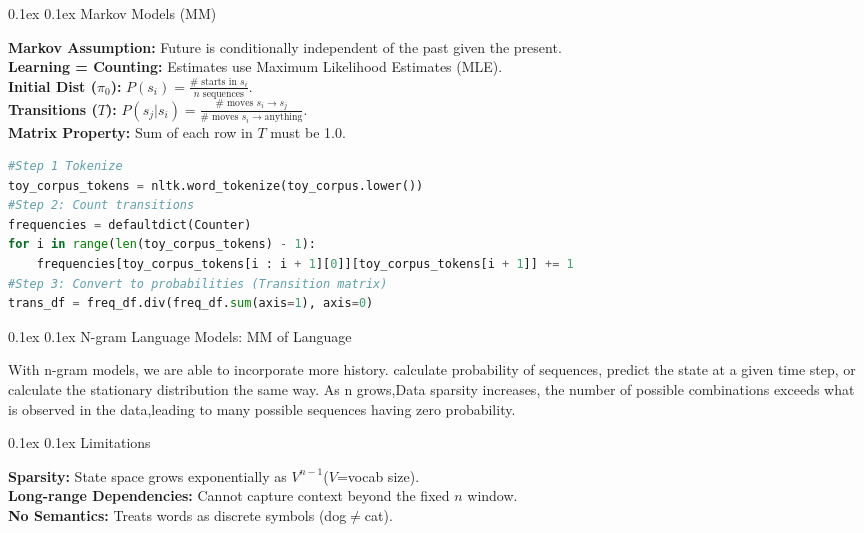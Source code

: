 \documentclass[8pt,landscape]{article}
\makeatletter
\renewcommand{\section}{\@startsection{section}{2}{0pt}%
{0.1ex}%
{0.1ex}%
{\fontsize{8}{9}\bfseries\color{red}}}
\renewcommand{\subsection}{\@startsection{subsection}{2}{0pt}%
{0.1ex}%
{0.1ex}%
{\fontsize{8}{9}\bfseries\color{blue}}}
\newcommand{\smalltext}[1]{
{\fontsize{8}{9}\selectfont\sloppy #1\par}
}
\makeatother
\begin{document}
\begin{multicols}{3}
\section{Markov Models (MM)}
\smalltext{
\textbf{Markov Assumption:} Future is conditionally independent of the past given the present. \\
\textbf{Learning = Counting:} Estimates use Maximum Likelihood Estimates (MLE). \\
\textbf{Initial Dist ($\pi_0$):} $P(s_i) = \frac{\# \text{ starts in } s_i}{n \text{ sequences}}$. \\
\textbf{Transitions ($T$):} $P(s_j | s_i) = \frac{\# \text{ moves } s_i \to s_j}{\# \text{ moves } s_i \to \text{anything}}$. \\
\textbf{Matrix Property:} Sum of each row in $T$ must be 1.0.
}

\begin{lstlisting}[language=python]
#Step 1 Tokenize
toy_corpus_tokens = nltk.word_tokenize(toy_corpus.lower())
#Step 2: Count transitions
frequencies = defaultdict(Counter) 
for i in range(len(toy_corpus_tokens) - 1):
    frequencies[toy_corpus_tokens[i : i + 1][0]][toy_corpus_tokens[i + 1]] += 1
#Step 3: Convert to probabilities (Transition matrix)
trans_df = freq_df.div(freq_df.sum(axis=1), axis=0)
\end{lstlisting}

\section{N-gram Language Models: MM of Language}
\smalltext{
  With n-gram models, we are able to incorporate more history. calculate probability of sequences, predict the state at a given time step, or calculate the stationary distribution the same way.
As n grows,Data sparsity increases, the number of possible combinations exceeds what is observed in the data,leading to many possible sequences having zero probability.
}

\subsection{Limitations}
\smalltext{
\textbf{Sparsity:} State space grows exponentially as $V^{n-1}$($V$=vocab size). \\
\textbf{Long-range Dependencies:} Cannot capture context beyond the fixed $n$ window. \\
\textbf{No Semantics:} Treats words as discrete symbols (dog$\neq$cat).
}


\end{multicols}
\end{document}
